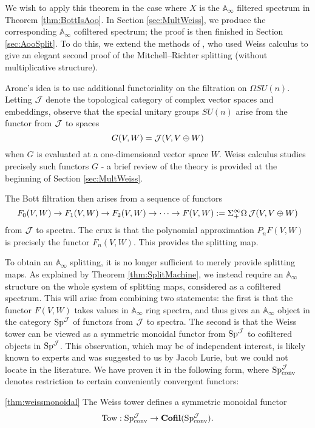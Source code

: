 We wish to apply this theorem in the case where $X$ is the $\mathbb{A}_\infty$ filtered spectrum in Theorem \ref{thm:BottIsAoo}.  In Section \ref{sec:MultWeiss}, we produce the corresponding $\mathbb{A}_\infty$ cofiltered spectrum; the proof is then finished in Section \ref{sec:AooSplit}.  To do this, we extend the methods of \cite{Arone}, who used Weiss calculus to give an elegant second proof of the Mitchell--Richter splitting (without multiplicative structure).  

Arone's idea is to use additional functoriality on the filtration on $\Omega SU(n)$.  Letting $\operatorname{\mathcal{J}}$ denote the topological category of complex vector spaces and embeddings, observe that the special unitary groups $SU(n)$ arise from the functor from $\operatorname{\mathcal{J}}$ to spaces $$G(V,W) = \operatorname{\mathcal{J}} (V,V\oplus W)$$  when $G$ is evaluated at a one-dimensional vector space $W$.  Weiss calculus studies precisely such functors $G$ - a brief review of the theory is provided at the beginning of Section \ref{sec:MultWeiss}.  %

The Bott filtration then arises from a sequence of functors $$F_0(V,W) \to F_1(V,W) \to F_2(V,W) \to \cdots \to F(V,W) := \Sigma^{\infty}_+ \Omega \operatorname{\mathcal{J}}(V, V\oplus W)$$ from $\operatorname{\mathcal{J}}$ to spectra.  The crux is that the polynomial approximation $P_n F(V,W)$ is precisely the functor $F_n(V,W).$  This provides the splitting map.   

To obtain an $\mathbb{A}_\infty$ splitting, it is no longer sufficient to merely provide splitting maps.  As explained by Theorem \ref{thm:SplitMachine}, we instead require an $\mathbb{A}_\infty$ structure on the whole system of splitting maps, considered as a cofiltered spectrum.  This will arise from combining two statements: the first is that the functor $F(V,W)$ takes values in $\mathbb{A}_\infty$ ring spectra, and thus gives an $\mathbb{A}_\infty$ object in the category $\operatorname{\mathrm{Sp}}^{\operatorname{\mathcal{J}}}$ of functors from $\operatorname{\mathcal{J}}$ to spectra.  The second is that the Weiss tower can be viewed as a symmetric monoidal functor from $\operatorname{\mathrm{Sp}}^{\operatorname{\mathcal{J}}}$ to cofiltered objects in $\operatorname{\mathrm{Sp}}^{\operatorname{\mathcal{J}}}$.  This observation, which may be of independent interest, is likely known to experts and was suggested to us by Jacob Lurie, but we could not locate in the literature.  We have proven it in the following form, where $\operatorname{\mathrm{Sp}}^{\operatorname{\mathcal{J}}}_{\text{conv}}$ denotes restriction to certain conveniently convergent functors:
\begin{customthm}{\ref{thm:weissmonoidal}}
The Weiss tower defines a symmetric monoidal functor $$\text{Tow}: \operatorname{\mathrm{Sp}}^{\operatorname{\mathcal{J}}}_{\text{conv}} \to \operatorname{\mathbf{Cofil}}(\operatorname{\mathrm{Sp}}^{\operatorname{\mathcal{J}}}_{\text{conv}}).$$
\end{customthm}

